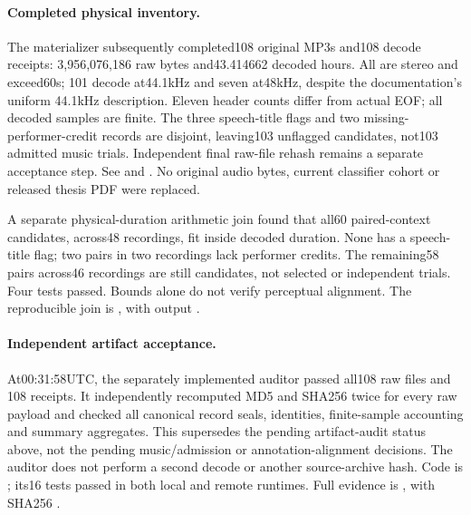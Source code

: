 \paragraph{Completed physical inventory.}
The materializer subsequently completed108 original MP3s and108 decode receipts:
3,956,076,186 raw bytes and43.414662 decoded hours. All are stereo and exceed60s;
101 decode at44.1kHz and seven at48kHz, despite the documentation's uniform
44.1kHz description. Eleven header counts differ from actual EOF; all decoded
samples are finite. The three speech-title flags and two missing-performer-credit
records are disjoint, leaving103 unflagged candidates, not103 admitted music
trials. Independent final raw-file rehash remains a separate acceptance step.
See  and
. No original audio
bytes, current classifier cohort or released thesis PDF were replaced.

A separate physical-duration arithmetic join found that all60 paired-context
candidates, across48 recordings, fit inside decoded duration. None has a
speech-title flag; two pairs in two recordings lack performer credits. The
remaining58 pairs across46 recordings are still candidates, not selected or
independent trials. Four tests passed. Bounds alone do not verify perceptual
alignment. The reproducible join is
, with output
.

\paragraph{Independent artifact acceptance.}
At00:31:58UTC, the separately implemented auditor passed all108 raw files and
108 receipts. It independently recomputed MD5 and SHA256 twice for every raw
payload and checked all canonical record seals, identities, finite-sample
accounting and summary aggregates. This supersedes the pending artifact-audit
status above, not the pending music/admission or annotation-alignment decisions.
The auditor does not perform a second decode or another source-archive hash.
Code is ; its16 tests passed in both local
and remote runtimes. Full evidence is
, with SHA256
.

